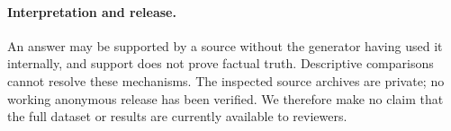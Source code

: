\paragraph{Interpretation and release.}
An answer may be supported by a source without the generator having used it internally, and support does not prove factual truth. Descriptive comparisons cannot resolve these mechanisms. The inspected source archives are private; no working anonymous release has been verified. We therefore make no claim that the full dataset or results are currently available to reviewers. 
